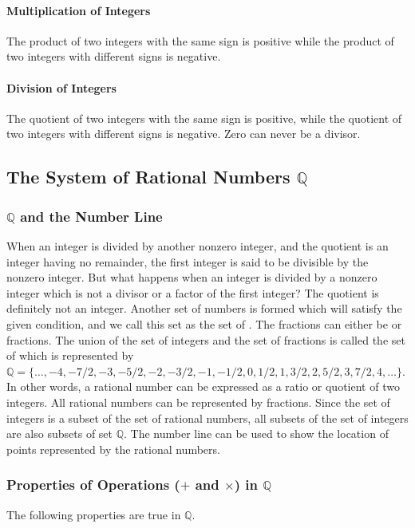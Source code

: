 \paragraph*{Multiplication of Integers}
The product of two integers with the same sign is positive while the product of two integers
with different signs is negative.

\paragraph*{Division of Integers}
The quotient of two integers with the same sign is positive, while the quotient of two
integers with different signs is negative. Zero can never be a divisor.
\subsection*{The System of Rational Numbers $\mathbb Q$}
\subsubsection*{$\mathbb Q$ and the Number Line}
When an integer is divided by another nonzero integer, and the quotient is an integer having no
remainder, the first integer is said to be divisible by the nonzero integer. But what happens when an
integer is divided by a nonzero integer which is not a divisor or a factor of the first integer? The
quotient is definitely not an integer. Another set of numbers is formed which will satisfy the given
condition, and we call this set as the set of . The fractions can either be  or 
fractions. The union of the set of integers and the set of fractions is called the set of  which is represented by $\mathbb Q = \{\ldots, -4, -7/2, -3, -5/2, -2, -3/2, -1, -1/2, 0, 1/2, 1, 3/2, 2, 5/2, 3,
7/2, 4, \ldots\}$. In other words, a rational number can be expressed as a ratio or quotient of two integers.
All rational numbers can be represented by fractions. Since the set of integers is a subset of the set
of rational numbers, all subsets of the set of integers are also subsets of set $\mathbb Q$. The number line can
be used to show the location of points represented by the rational numbers.
\subsubsection*{Properties of Operations ($+$ and $\times$) in $\mathbb Q$}
The following properties are true in $\mathbb Q$.

